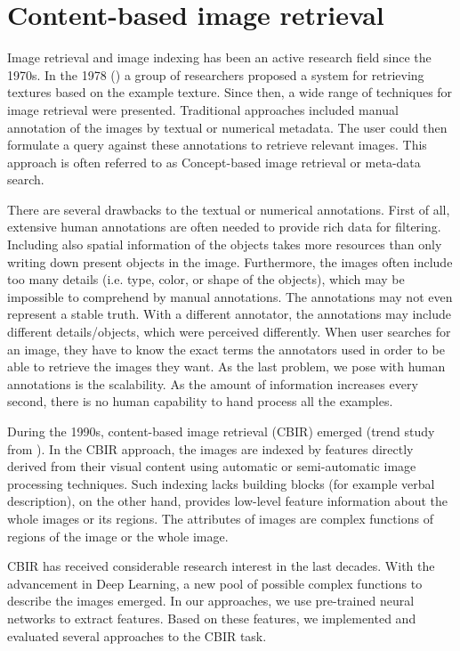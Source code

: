 \chapter{Content-based image retrieval}
\label{ch:content_based}

Image retrieval and image indexing has been an active research field since the 1970s. In the 1978 (\cite{tamura1978textural}) a group of researchers proposed a system for retrieving textures based on the example texture. Since then, a wide range of techniques for image retrieval were presented. Traditional approaches included manual annotation of the images by textual or numerical metadata. The user could then formulate a query against these annotations to retrieve relevant images. This approach is often referred to as Concept-based image retrieval or meta-data search.

There are several drawbacks to the textual or numerical annotations. First of all, extensive human annotations are often needed to provide rich data for filtering. Including also spatial information of the objects takes more resources than only writing down present objects in the image. Furthermore, the images often include too many details (i.e. type, color, or shape of the objects), which may be impossible to comprehend by manual annotations.  The annotations may not even represent a stable truth. With a different annotator, the annotations may include different details/objects, which were perceived differently. When user searches for an image, they have to know the exact terms the annotators used in order to be able to retrieve the images they want. As the last problem, we pose with human annotations is the scalability. As the amount of information increases every second, there is no human capability to hand process all the examples.

During the 1990s, content-based image retrieval (CBIR) emerged (trend study from \cite{datta2008image}). In the CBIR approach, the images are indexed by features directly derived from their visual content using automatic or semi-automatic image processing techniques. Such indexing lacks building blocks (for example verbal description), on the other hand, provides low-level feature information about the whole images or its regions. The attributes of images are complex functions of regions of the image or the whole image.

CBIR has received considerable research interest in the last decades. With the advancement in Deep Learning, a new pool of possible complex functions to describe the images emerged. In our approaches, we use pre-trained neural networks to extract features. Based on these features, we implemented and evaluated several approaches to the CBIR task.

